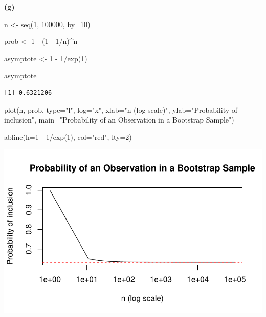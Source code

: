 \documentclass[
  letterpaper,
  DIV=11,
  numbers=noendperiod]{scrartcl}
\newenvironment{Shaded}{\begin{snugshade}}{\end{snugshade}}
\newcommand{\AttributeTok}[1]{\textcolor[rgb]{0.40,0.45,0.13}{#1}}
\newcommand{\DecValTok}[1]{\textcolor[rgb]{0.68,0.00,0.00}{#1}}
\newcommand{\FunctionTok}[1]{\textcolor[rgb]{0.28,0.35,0.67}{#1}}
\newcommand{\NormalTok}[1]{\textcolor[rgb]{0.00,0.23,0.31}{#1}}
\newcommand{\OtherTok}[1]{\textcolor[rgb]{0.00,0.23,0.31}{#1}}
\newcommand{\SpecialCharTok}[1]{\textcolor[rgb]{0.37,0.37,0.37}{#1}}
\newcommand{\StringTok}[1]{\textcolor[rgb]{0.13,0.47,0.30}{#1}}
\begin{document}
\textbf{(g)}

\begin{Shaded}
\begin{Highlighting}[]
\NormalTok{n }\OtherTok{\textless{}{-}} \FunctionTok{seq}\NormalTok{(}\DecValTok{1}\NormalTok{, }\DecValTok{100000}\NormalTok{, }\AttributeTok{by=}\DecValTok{10}\NormalTok{)}

\NormalTok{prob }\OtherTok{\textless{}{-}} \DecValTok{1} \SpecialCharTok{{-}}\NormalTok{ (}\DecValTok{1} \SpecialCharTok{{-}} \DecValTok{1}\SpecialCharTok{/}\NormalTok{n)}\SpecialCharTok{\^{}}\NormalTok{n}

\NormalTok{asymptote }\OtherTok{\textless{}{-}} \DecValTok{1} \SpecialCharTok{{-}} \DecValTok{1}\SpecialCharTok{/}\FunctionTok{exp}\NormalTok{(}\DecValTok{1}\NormalTok{)}

\NormalTok{asymptote}
\end{Highlighting}
\end{Shaded}

\begin{verbatim}
[1] 0.6321206
\end{verbatim}

\begin{Shaded}
\begin{Highlighting}[]
\FunctionTok{plot}\NormalTok{(n, prob, }\AttributeTok{type=}\StringTok{"l"}\NormalTok{, }\AttributeTok{log=}\StringTok{"x"}\NormalTok{, }
     \AttributeTok{xlab=}\StringTok{"n (log scale)"}\NormalTok{, }\AttributeTok{ylab=}\StringTok{"Probability of inclusion"}\NormalTok{,}
     \AttributeTok{main=}\StringTok{"Probability of an Observation in a Bootstrap Sample"}\NormalTok{)}

\FunctionTok{abline}\NormalTok{(}\AttributeTok{h=}\DecValTok{1} \SpecialCharTok{{-}} \DecValTok{1}\SpecialCharTok{/}\FunctionTok{exp}\NormalTok{(}\DecValTok{1}\NormalTok{), }\AttributeTok{col=}\StringTok{"red"}\NormalTok{, }\AttributeTok{lty=}\DecValTok{2}\NormalTok{)}
\end{Highlighting}
\end{Shaded}

\begin{center}
\includegraphics{hw3_files/figure-pdf/unnamed-chunk-1-1.pdf}
\end{center}
\end{document}
